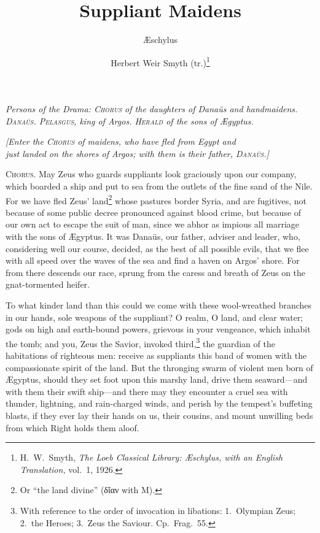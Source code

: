 \documentclass[12pt]{article}
\title{Suppliant Maidens}
\author{{\AE}schylus \and Herbert Weir Smyth (tr.)\footnote{H.~W.~Smyth, \textit{The Loeb Classical Library: {\AE}schylus, with an English Translation,} vol.~1, 1926.}}
\date{}
\begin{document}
\maketitle

\begin{center}
\textit{Persons of the Drama: \textsc{Chorus} of the daughters of Dana\"{u}s and handmaidens.\\
\textsc{Dana\"{u}s. Pelasgus,} king of Argos. \textsc{Herald} of the sons of {\AE}gyptus.}
\end{center}

\begin{center}
\textit{[Enter the \textsc{Chorus} of maidens, who have fled from Egypt and\\
just landed on the shores of Argos; with them is their father, \textsc{Dana\"{u}s}.]}
\end{center}

\noindent \textsc{Chorus.} May Zeus who guards suppliants look graciously upon our company, which boarded a ship and put to sea from the outlets of the fine sand of the Nile. For we have fled Zeus' land\footnote{Or ``the land divine'' (δῖαν with M).} whose pastures border Syria, and are fugitives, not because of some public decree pronounced against blood crime, but because of our own act to escape the suit of man, since we abhor as impious all marriage with the sons of {\AE}gyptus. It was Dana\"{u}s, our father, adviser and leader, who, considering well our course, decided, as the best of all possible evils, that we flee with all speed over the waves of the sea and find a haven on Argos' shore. For from there descends our race, sprung from the caress and breath of Zeus on the gnat-tormented heifer.

To what kinder land than this could we come with these wool-wreathed branches in our hands, sole weapons of the suppliant? O realm, O land, and clear water; gods on high and earth-bound powers, grievous in your vengeance, which inhabit the tomb; and you, Zeus the Savior, invoked third,\footnote{With reference to the order of invocation in libations: 1.~Olympian Zeus; 2.~the Heroes; 3.~Zeus the Saviour. Cp.~Frag.~55.} the guardian of the habitations of righteous men: receive as suppliants this band of women with the compassionate spirit of the land. But the thronging swarm of violent men born of {\AE}gyptus, should they set foot upon this marshy land, drive them seaward---and with them their swift ship---and there may they encounter a cruel sea with thunder, lightning, and rain-charged winds, and perish by the tempest's buffeting blasts, if they ever lay their hands on us, their cousins, and mount unwilling beds from which Right holds them aloof.
\end{document}
